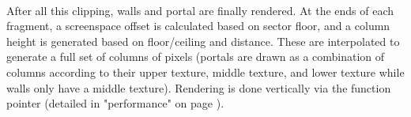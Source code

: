 \\

 \vspace{10mm}
















After all this clipping, walls and portal are finally rendered. At the ends of each fragment, a screenspace  offset is calculated based on sector floor, and a column height is generated based on floor/ceiling and distance. These are interpolated to generate a full set of columns of pixels (portals are drawn as a combination of columns according to their upper texture, middle texture, and lower texture while walls only have a middle texture). Rendering is done vertically via the  function pointer (detailed in "performance" on page \pageref{performances}).\\

